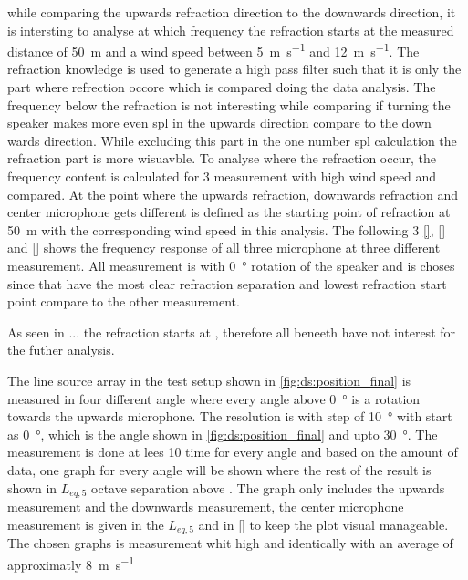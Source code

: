 while comparing the upwards refraction direction to the downwards direction, it is intersting to analyse at which frequency the refraction starts at the measured distance of \SI{50}{\meter} and a wind speed between \SI{5}{\meter\per\second} and \SI{12}{\meter\per\second}. The refraction knowledge is used to generate a high pass filter such that it is only the part where refrection occore which is compared doing the data analysis. The frequency below the refraction is not interesting while comparing if turning the speaker makes more even \gls{spl} in the upwards direction compare to the down wards direction. While excluding this part in the one number \gls{spl} calculation the refraction part is more wisuavble. To analyse where the refraction occur, the frequency content is calculated for 3 measurement with high wind speed and compared. At the point where the upwards refraction, downwards refraction and center microphone gets different is defined as the starting point of refraction at \SI{50}{\meter} with the corresponding wind speed in this analysis. The following 3 \autoref{}, \autoref{} and \autoref{} shows the frequency response of all three microphone at three different measurement. All measurement is with \SI{0}{\degree} rotation of the speaker and is choses since that have the most clear refraction separation and lowest refraction start point compare to the other measurement.




As seen in ... the refraction starts at , therefore all beneeth  have not interest for the futher analysis.


The line source array in the test setup shown in \autoref{fig:ds:position_final} is measured in four different angle where every angle above \SI{0}{\degree} is a rotation towards the upwards microphone. The resolution is with step of \SI{10}{\degree} with start as \SI{0}{\degree}, which is the angle shown in \autoref{fig:ds:position_final} and upto \SI{30}{\degree}. The measurement is done at lees 10 time for every angle and based on the amount of data, one graph for every angle will be shown where the rest of the result is shown in $L_{eq,5}$ octave separation above . The graph only includes the upwards measurement and the downwards measurement, the center microphone measurement is given in the $L_{eq,5}$ and in \autoref{} to keep the plot visual manageable. The chosen graphs is measurement whit high and identically with an average of approximatly \SI{8}{\meter\per\second}


